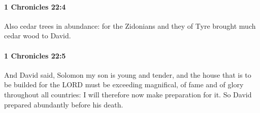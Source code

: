 		\paragraph{1 Chronicles 22:4} %
			\label{1CHRONICLES-22-4}

			Also cedar trees in abundance: for the Zidonians and they of Tyre brought much cedar wood to David.


		\paragraph{1 Chronicles 22:5} %
			\label{1CHRONICLES-22-5}

			And David said, Solomon my son is young and tender, and the house that is to be builded for the LORD must be exceeding magnifical, of fame and of glory throughout all countries: I will therefore now make preparation for it. So David prepared abundantly before his death.

